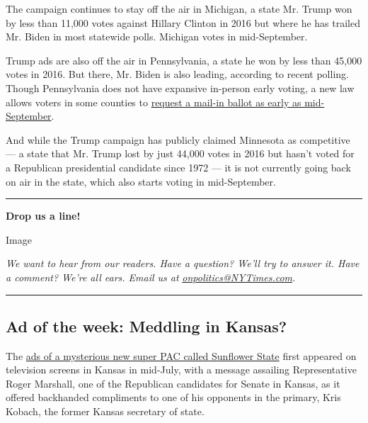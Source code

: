 The campaign continues to stay off the air in Michigan, a state Mr.
Trump won by less than 11,000 votes against Hillary Clinton in 2016 but
where he has trailed Mr. Biden in most statewide polls. Michigan votes
in mid-September.

Trump ads are also off the air in Pennsylvania, a state he won by less
than 45,000 votes in 2016. But there, Mr. Biden is also leading,
according to recent polling. Though Pennsylvania does not have expansive
in-person early voting, a new law allows voters in some counties to
\href{https://www.inquirer.com/politics/election/pennsylvania-early-voting-absentee-ballots-20200113.html}{request
a mail-in ballot as early as mid-September}.

And while the Trump campaign has publicly claimed Minnesota as
competitive --- a state that Mr. Trump lost by just 44,000 votes in 2016
but hasn't voted for a Republican presidential candidate since 1972 ---
it is not currently going back on air in the state, which also starts
voting in mid-September.

\begin{center}\rule{0.5\linewidth}{\linethickness}\end{center}

\textbf{Drop us a line!}

Image

\emph{We want to hear from our readers. Have a question? We'll try to
answer it. Have a comment? We're all ears. Email us at}
\href{mailto:onpolitics@NYTimes.com}{\emph{onpolitics@NYTimes.com}}\emph{.}

\begin{center}\rule{0.5\linewidth}{\linethickness}\end{center}

\hypertarget{ad-of-the-week-meddling-in-kansas}{%
\subsection{Ad of the week: Meddling in
Kansas?}\label{ad-of-the-week-meddling-in-kansas}}

The \href{https://twitter.com/greggiroux/status/1288089119529283585}{ads
of a mysterious new super PAC called Sunflower State} first appeared on
television screens in Kansas in mid-July, with a message assailing
Representative Roger Marshall, one of the Republican candidates for
Senate in Kansas, as it offered backhanded compliments to one of his
opponents in the primary, Kris Kobach, the former Kansas secretary of
state.

